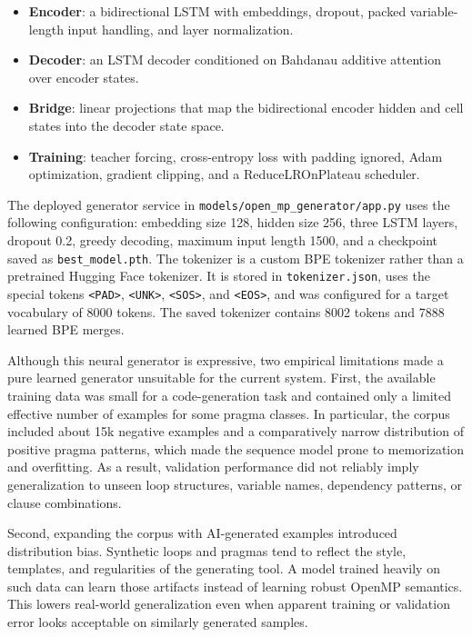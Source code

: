 \documentclass[11pt,a4paper]{article}
\newcommand{\modulepath}[1]{\texttt{#1}}
\begin{document}
\begin{itemize}[leftmargin=*]
  \item \textbf{Encoder}: a bidirectional LSTM with embeddings, dropout, packed
        variable-length input handling, and layer normalization.
  \item \textbf{Decoder}: an LSTM decoder conditioned on Bahdanau additive
        attention over encoder states.
  \item \textbf{Bridge}: linear projections that map the bidirectional encoder
        hidden and cell states into the decoder state space.
  \item \textbf{Training}: teacher forcing, cross-entropy loss with padding
        ignored, Adam optimization, gradient clipping, and a
        ReduceLROnPlateau scheduler.
\end{itemize}

The deployed generator service in \modulepath{models/open\_mp\_generator/app.py}
uses the following configuration: embedding size 128, hidden size 256, three
LSTM layers, dropout 0.2, greedy decoding, maximum input length 1500, and a
checkpoint saved as \modulepath{best\_model.pth}. The tokenizer is a custom BPE
tokenizer rather than a pretrained Hugging Face tokenizer. It is stored in
\modulepath{tokenizer.json}, uses the special tokens \texttt{<PAD>},
\texttt{<UNK>}, \texttt{<SOS>}, and \texttt{<EOS>}, and was configured for a
target vocabulary of 8000 tokens. The saved tokenizer contains 8002 tokens and
7888 learned BPE merges.

Although this neural generator is expressive, two empirical limitations made a
pure learned generator unsuitable for the current system. First, the available
training data was small for a code-generation task and contained only a limited
effective number of examples for some pragma classes. In particular, the corpus
included about 15k negative examples and a comparatively narrow distribution of
positive pragma patterns, which made the sequence model prone to memorization
and overfitting. As a result, validation performance did not reliably imply
generalization to unseen loop structures, variable names, dependency patterns,
or clause combinations.

Second, expanding the corpus with AI-generated examples introduced distribution
bias. Synthetic loops and pragmas tend to reflect the style, templates, and
regularities of the generating tool. A model trained heavily on such data can
learn those artifacts instead of learning robust OpenMP semantics. This lowers
real-world generalization even when apparent training or validation error looks
acceptable on similarly generated samples.
\end{document}
